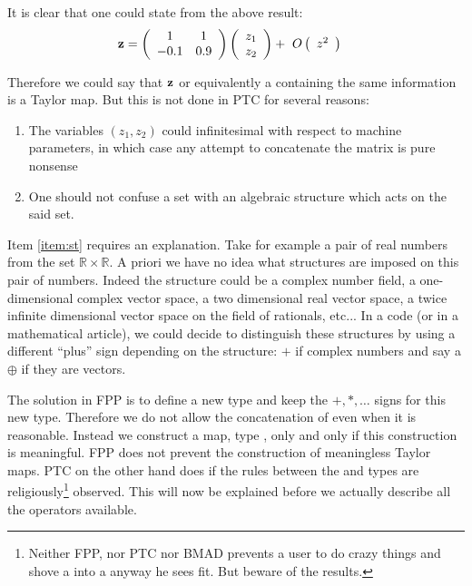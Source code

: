\documentclass[english,12pt,article]{article} %
\begin{document}
{It is clear that one could state from the above result:
%
\begin{align} {\bf z}&=\left({\begin{array}{cc}1&1\\
-0.1&0.9\end{array}}\right)\left({\begin{array}{c} {z}_{1} \cr {z}_{2} \end{array}}\right)+\ O\left({\begin{array}{c}{z}^{2}\end{array}}\right) \label{eq:lin1}\end{align}

Therefore we could say that ${\bf z}$ or equivalently a  containing the same information is a Taylor map. But this is not done in PTC for several reasons:

\begin{enumerate}
\item The variables  $(z_1,z_2)$ could   infinitesimal with respect to machine parameters, in which case any attempt to concatenate the matrix is pure nonsense 
\item\label{item:st}  One should not confuse a set with an algebraic structure which acts on the said set.
\end{enumerate}

Item \ref{item:st} requires an explanation. Take for example  a pair of real numbers from the set  $\mathbb{R} \times \mathbb{R}$.  A priori we have no idea what structures are imposed on this pair of numbers. Indeed the structure could be    a complex number field, a one-dimensional complex vector space, a two dimensional real vector space, a twice infinite dimensional  vector space on the field of rationals, etc... In a code (or in a mathematical article), we could decide to  distinguish these structures by using a different ``plus'' sign depending on the structure: $+$ if complex numbers and say a $\oplus$ if they are vectors. 

The solution in FPP is to define  a new type and  keep the $+,*,\ldots $ signs for this new type.  Therefore we do not allow the concatenation of  even when it is reasonable. Instead we construct a map, type , only and only if this construction is meaningful.  FPP does not prevent the construction of meaningless Taylor maps. PTC on the other hand does if the rules between the  and   types are religiously\footnote{Neither FPP, nor PTC nor  BMAD prevents  a user to do crazy things and shove a   into a   anyway he sees fit. But beware of the results.}  observed.  This will now be explained before we actually describe all the operators available.

}
\end{document}
